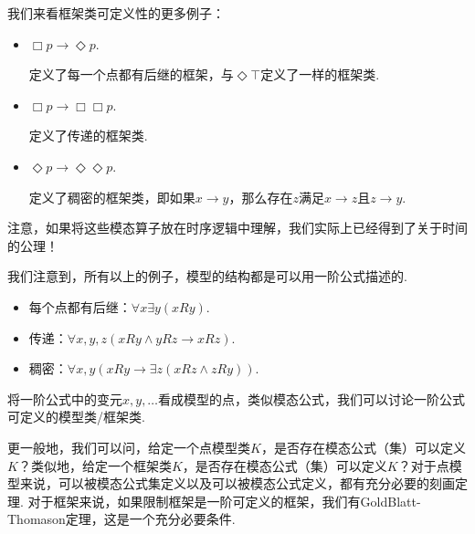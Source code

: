 我们来看框架类可定义性的更多例子：
\begin{example}
\begin{itemize}
    \item $\Box p\to\Diamond p$.
 
    定义了每一个点都有后继的框架，与$\Diamond\top$定义了一样的框架类.
    
    \item $\Box p\to\Box\Box p$.
    
    定义了传递的框架类.
    
    \item $\Diamond p\to\Diamond \Diamond p$.
    
    定义了稠密的框架类，即如果$x\to y$，那么存在$z$满足$x\to z$且$z\to y$.
\end{itemize}
注意，如果将这些模态算子放在时序逻辑中理解，我们实际上已经得到了关于时间的公理！%
\end{example}

\begin{remark}
我们注意到，所有以上的例子，模型的结构都是可以用一阶公式描述的.
\begin{itemize}
    \item 每个点都有后继：$\forall x\exists y(xRy)$.
    \item 传递：$\forall x,y,z(xRy\wedge yRz\to xRz)$.
    \item 稠密：$\forall x,y(xRy\to\exists z(xRz\wedge zRy))$.
\end{itemize}
 将一阶公式中的变元$x,y,\dots$看成模型的点，类似模态公式，我们可以讨论一阶公式可定义的模型类/框架类. 
 
 更一般地，我们可以问，给定一个点模型类$K$，是否存在模态公式（集）可以定义$K$？类似地，给定一个框架类$K$，是否存在模态公式（集）可以定义$K$？对于点模型来说，可以被模态公式集定义以及可以被模态公式定义，都有充分必要的刻画定理. 对于框架来说，如果限制框架是一阶可定义的框架，我们有GoldBlatt-Thomason定理，这是一个充分必要条件.
\end{remark}

\endgroup